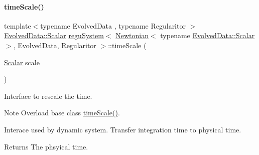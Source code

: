 \paragraph{\texorpdfstring{time\+Scale()}{timeScale()}}
{\footnotesize\ttfamily template$<$typename Evolved\+Data , typename Regularitor $>$ \\
\mbox{\hyperlink{classregu_system_aca8ee2c387943164ee3ea68370fc3ac0}{Evolved\+Data\+::\+Scalar}} \mbox{\hyperlink{classregu_system}{regu\+System}}$<$ \mbox{\hyperlink{class_newtonian}{Newtonian}}$<$ typename \mbox{\hyperlink{classregu_system_aca8ee2c387943164ee3ea68370fc3ac0}{Evolved\+Data\+::\+Scalar}} $>$, Evolved\+Data, Regularitor $>$\+::time\+Scale (\begin{DoxyParamCaption}\item[{\mbox{\hyperlink{classregu_system_3_01_newtonian_3_01typename_01_evolved_data_1_1_scalar_01_4_00_01_evolved_data_00_01_regularitor_01_4_a6993f135075541f441a7642845b183a5}{Scalar}}}]{scale }\end{DoxyParamCaption})}



Interface to rescale the time. 

\begin{DoxyNote}{Note}
Overload base class \mbox{\hyperlink{classregu_system_3_01_newtonian_3_01typename_01_evolved_data_1_1_scalar_01_4_00_01_evolved_data_00_01_regularitor_01_4_adc3c44589517529c80470050edf5db0c}{time\+Scale()}}.
\end{DoxyNote}
Interace used by dynamic system. Transfer integration time to physical time. \begin{DoxyReturn}{Returns}
The phsyical time. 
\end{DoxyReturn}
\mbox{\label{classregu_system_3_01_newtonian_3_01typename_01_evolved_data_1_1_scalar_01_4_00_01_evolved_data_00_01_regularitor_01_4_a90719aee4d16176e982461d1f4d2fd33}} 
